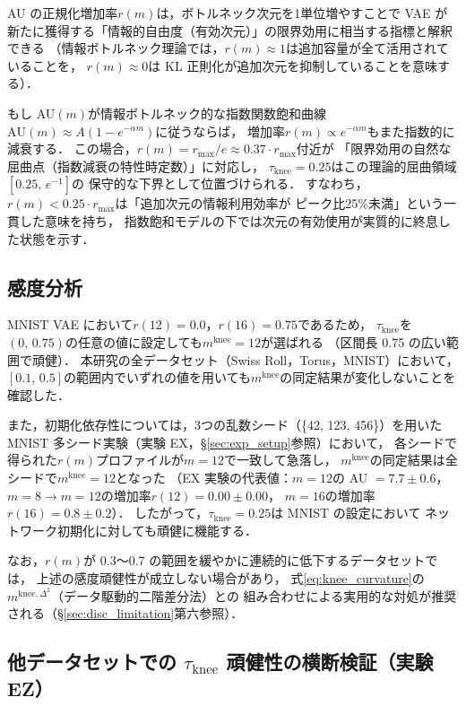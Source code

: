 \documentclass[12pt,a4paper]{jsarticle}
\newcommand{\mknee}{m^{\mathrm{knee}}}      %
\begin{document}
AU の正規化増加率$r(m)$は，ボトルネック次元を1単位増やすことで
VAE が新たに獲得する「情報的自由度（有効次元）」の限界効用に相当する指標と解釈できる
（情報ボトルネック理論\cite{tishby2000ib}では，$r(m) \approx 1$は追加容量が全て活用されていることを，
$r(m) \approx 0$は KL 正則化が追加次元を抑制していることを意味する）．

もし AU$(m)$が情報ボトルネック的な指数関数飽和曲線
$\mathrm{AU}(m) \approx A(1 - e^{-\alpha m})$に従うならば，
増加率$r(m) \propto e^{-\alpha m}$もまた指数的に減衰する．
この場合，$r(m) = r_{\max}/e \approx 0.37 \cdot r_{\max}$付近が
「限界効用の自然な屈曲点（指数減衰の特性時定数）」に対応し\cite{tishby2000ib}，
$\tau_{\mathrm{knee}} = 0.25$はこの理論的屈曲領域$[0.25,\, e^{-1}]$の
保守的な下界として位置づけられる．
すなわち，$r(m) < 0.25 \cdot r_{\max}$は「追加次元の情報利用効率が
ピーク比25\%未満」という一貫した意味を持ち，
指数飽和モデルの下では次元の有効使用が実質的に終息した状態を示す．

\subsection*{感度分析}

MNIST VAE において$r(12) = 0.0$，$r(16) = 0.75$であるため，
$\tau_{\mathrm{knee}}$を$(0,\, 0.75)$の任意の値に設定しても$\mknee = 12$が選ばれる
（区間長 0.75 の広い範囲で頑健）．
本研究の全データセット（Swiss Roll，Torus，MNIST）において，
$[0.1,\, 0.5]$の範囲内でいずれの値を用いても$\mknee$の同定結果が変化しないことを確認した．

また，初期化依存性については，3つの乱数シード（\{42, 123, 456\}）を用いた
MNIST 多シード実験（実験 EX，§\ref{sec:exp_setup}参照）において，
各シードで得られた$r(m)$プロファイルが$m = 12$で一致して急落し，
$\mknee$の同定結果は全シードで$\mknee = 12$となった
（EX 実験の代表値：$m=12$の AU $= 7.7\pm0.6$，
$m=8 \to m=12$の増加率$r(12) = 0.00\pm0.00$，
$m=16$の増加率$r(16) = 0.8\pm0.2$）．
したがって，$\tau_{\mathrm{knee}} = 0.25$は MNIST の設定において
ネットワーク初期化に対しても頑健に機能する．

なお，$r(m)$が 0.3〜0.7 の範囲を緩やかに連続的に低下するデータセットでは，
上述の感度頑健性が成立しない場合があり，
式\eqref{eq:knee_curvature}の$m^{\mathrm{knee},\Delta^2}$（データ駆動的二階差分法）との
組み合わせによる実用的な対処が推奨される（§\ref{sec:disc_limitation}第六参照）．

\subsection*{他データセットでの $\tau_\mathrm{knee}$ 頑健性の横断検証（実験 EZ）}\label{sec:exp_ez}
\end{document}
